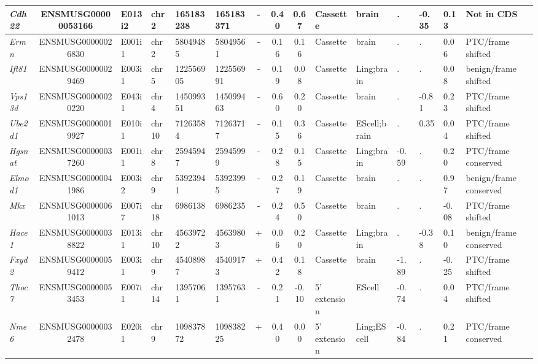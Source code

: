 \begin{landscape}
\begin{table}[htbp]
{\begin{tabular}{|l|c|l|l|l|l|c|c|c|l|l|l|l|l|l|}
		\textit{Cdh22} & ENSMUSG00000053166 & E013i2 & chr2  & 165183238 & 165183371 & -     & 0.40  & 0.67  & Cassette & brain & .     & -0.35 & 0.13  & Not in CDS \\ \hline
		\textit{Ermn} & ENSMUSG00000026830 & E001i1 & chr2  & 58049485 & 58049561 & -     & 0.16  & 0.16  & Cassette & brain & .     & .     & 0.06  & PTC/frame shifted \\ \hline
		\textit{Ift81} & ENSMUSG00000029469 & E003i1 & chr5  & 122556905 & 122556991 & -     & 0.19  & 0.08  & Cassette & Ling;brain & .     & .     & 0.08  & benign/frame shifted \\ \hline
		\textit{Vps13d} & ENSMUSG00000020220 & E043i1 & chr4  & 145099351 & 145099463 & -     & 0.60  & 0.20  & Cassette & brain & .     & -0.81 & 0.23  & PTC/frame shifted \\ \hline
		\textit{Ube2d1} & ENSMUSG00000019927 & E010i1 & chr10 & 71263584 & 71263717 & -     & 0.15  & 0.36  & Cassette & EScell;brain & .     & 0.35  & 0.04  & PTC/frame shifted \\ \hline
		\textit{Hgsnat} & ENSMUSG00000037260 & E001i1 & chr8  & 25945947 & 25945999 & -     & 0.28  & 0.15  & Cassette & Ling;brain & -0.59 & .     & 0.20  & PTC/frame conserved \\ \hline
		\textit{Elmod1} & ENSMUSG00000041986 & E003i2 & chr9  & 53923941 & 53923995 & -     & 0.27  & 0.19  & Cassette & brain & .     & .     & 0.97  & benign/frame conserved \\ \hline
		\textit{Mkx} & ENSMUSG00000061013 & E007i7 & chr18 & 6986138 & 6986235 & -     & 0.24  & 0.50  & Cassette & brain & .     & .     & -0.08 & PTC/frame shifted \\ \hline
		\textit{Hace1} & ENSMUSG00000038822 & E013i1 & chr10 & 45639722 & 45639803 & +     & 0.06  & 0.20  & Cassette & Ling;brain & .     & -0.38 & 0.10  & benign/frame conserved \\ \hline
		\textit{Fxyd2} & ENSMUSG00000059412 & E003i1 & chr9  & 45408987 & 45409173 & +     & 0.42  & 0.18  & Cassette & brain & -1.89 & .     & -0.25 & PTC/frame shifted \\ \hline
		\textit{Thoc7} & ENSMUSG00000053453 & E007i1 & chr14 & 13957061 & 13957631 & -     & 0.21  & -0.10 & 5' extension & EScell & -0.74 & .     & 0.04  & PTC/frame shifted \\ \hline
		\textit{Nme6} & ENSMUSG00000032478 & E020i1 & chr9  & 109837872 & 109838225 & +     & 0.40  & 0.00  & 5' extension & Ling;EScell & -0.84 & .     & 0.21  & PTC/frame conserved \\ \hline

\end{tabular}}
\end{table}
\end{landscape}
